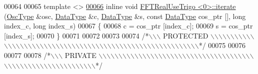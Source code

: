 \begin{DoxyCode}
00064 
00065 \textcolor{keyword}{template} <>
\hypertarget{a00107_source_l00066}{}\hyperlink{a00016_a2dac1a1e581632efdc35d71a9bb37c00}{00066} \textcolor{keyword}{inline} \textcolor{keywordtype}{void} \hyperlink{a00016}{FFTRealUseTrigo <0>::iterate} (\hyperlink{a00020}{OscType} &osc, 
      \hyperlink{a00016_a2a3c2e9635f2b74cd98df7923ebf0850}{DataType} &c, \hyperlink{a00016_a2a3c2e9635f2b74cd98df7923ebf0850}{DataType} &s, \textcolor{keyword}{const} \hyperlink{a00016_a2a3c2e9635f2b74cd98df7923ebf0850}{DataType} cos\_ptr [], \textcolor{keywordtype}{long} index\_c, \textcolor{keywordtype}{long} index\_s)
00067 \{
00068     c = cos\_ptr [index\_c];
00069     s = cos\_ptr [index\_s];
00070 \}
00071 
00072 
00073 
00074 \textcolor{comment}{/*\(\backslash\)\(\backslash\)\(\backslash\) PROTECTED \(\backslash\)\(\backslash\)\(\backslash\)\(\backslash\)\(\backslash\)\(\backslash\)\(\backslash\)\(\backslash\)\(\backslash\)\(\backslash\)\(\backslash\)\(\backslash\)\(\backslash\)\(\backslash\)\(\backslash\)\(\backslash\)\(\backslash\)\(\backslash\)\(\backslash\)\(\backslash\)\(\backslash\)\(\backslash\)\(\backslash\)\(\backslash\)\(\backslash\)\(\backslash\)\(\backslash\)\(\backslash\)\(\backslash\)\(\backslash\)\(\backslash\)\(\backslash\)\(\backslash\)\(\backslash\)\(\backslash\)\(\backslash\)\(\backslash\)\(\backslash\)\(\backslash\)\(\backslash\)\(\backslash\)\(\backslash\)\(\backslash\)\(\backslash\)\(\backslash\)\(\backslash\)\(\backslash\)\(\backslash\)\(\backslash\)\(\backslash\)\(\backslash\)\(\backslash\)\(\backslash\)\(\backslash\)\(\backslash\)\(\backslash\)\(\backslash\)\(\backslash\)\(\backslash\)\(\backslash\)*/}
00075 
00076 
00077 
00078 \textcolor{comment}{/*\(\backslash\)\(\backslash\)\(\backslash\) PRIVATE \(\backslash\)\(\backslash\)\(\backslash\)\(\backslash\)\(\backslash\)\(\backslash\)\(\backslash\)\(\backslash\)\(\backslash\)\(\backslash\)\(\backslash\)\(\backslash\)\(\backslash\)\(\backslash\)\(\backslash\)\(\backslash\)\(\backslash\)\(\backslash\)\(\backslash\)\(\backslash\)\(\backslash\)\(\backslash\)\(\backslash\)\(\backslash\)\(\backslash\)\(\backslash\)\(\backslash\)\(\backslash\)\(\backslash\)\(\backslash\)\(\backslash\)\(\backslash\)\(\backslash\)\(\backslash\)\(\backslash\)\(\backslash\)\(\backslash\)\(\backslash\)\(\backslash\)\(\backslash\)\(\backslash\)\(\backslash\)\(\backslash\)\(\backslash\)\(\backslash\)\(\backslash\)\(\backslash\)\(\backslash\)\(\backslash\)\(\backslash\)\(\backslash\)\(\backslash\)\(\backslash\)\(\backslash\)\(\backslash\)\(\backslash\)\(\backslash\)\(\backslash\)\(\backslash\)\(\backslash\)\(\backslash\)\(\backslash\)*/}

\end{DoxyCode}
